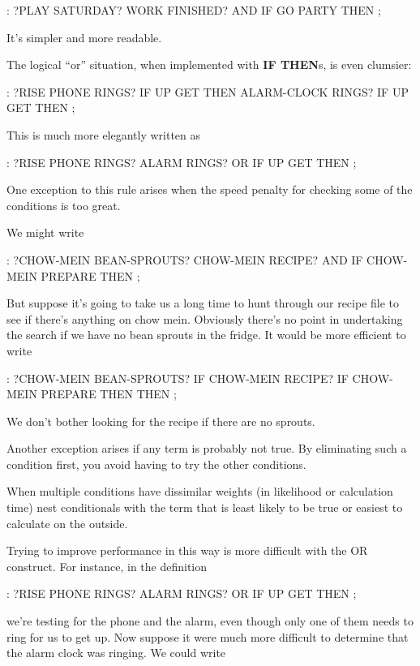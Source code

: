 \begin{Code}
: ?PLAY   SATURDAY?  WORK FINISHED? AND  IF
     GO PARTY  THEN ;
\end{Code}
It's simpler and more readable.

The logical ``or'' situation, when implemented with \textbf{IF THEN}s, is
even clumsier:

\begin{Code}
: ?RISE    PHONE RINGS? IF  UP GET  THEN
     ALARM-CLOCK RINGS?  IF UP GET THEN ;
\end{Code}
This is much more elegantly written as

\begin{Code}
: ?RISE  PHONE RINGS?  ALARM RINGS? OR  IF  UP GET THEN ;
\end{Code}
One exception to this rule arises when the speed penalty for checking
some of the conditions is too great.

We might write

\begin{Code}
: ?CHOW-MEIN   BEAN-SPROUTS?  CHOW-MEIN RECIPE?  AND IF
   CHOW-MEIN PREPARE  THEN ;
\end{Code}
But suppose it's going to take us a long time to hunt through our recipe
file to see if there's anything on chow mein. Obviously there's no point in
undertaking the search if we have no bean sprouts in the fridge. It would
be more efficient to write

\begin{Code}
: ?CHOW-MEIN   BEAN-SPROUTS? IF  CHOW-MEIN RECIPE? IF
   CHOW-MEIN PREPARE THEN   THEN ;
\end{Code}
We don't bother looking for the recipe if there are no sprouts.

Another exception arises if any term is probably not true. By
eliminating such a condition first, you avoid having to try the other
conditions.

\begin{tip}
When multiple conditions have dissimilar weights (in likelihood or
calculation time) nest conditionals with the term that is least likely
to be true or easiest to calculate on the outside.
\end{tip}
Trying to improve performance in this way is more difficult with the OR
construct. For instance, in the definition

\begin{Code}
: ?RISE  PHONE RINGS?  ALARM RINGS? OR  IF  UP GET THEN ;
\end{Code}
we're testing for the phone and the alarm, even though only one of them
needs to ring for us to get up. Now suppose it were much more difficult to
determine that the alarm clock was ringing. We could write

